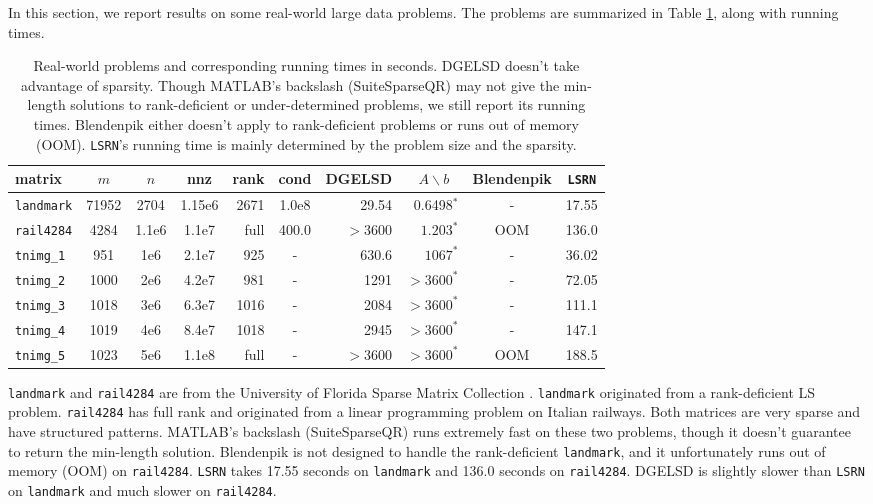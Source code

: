 \documentclass{siamltex}
\begin{document}
In this section, we report results on some real-world large data problems.  The
problems are summarized in Table \ref{tab:real-world-prob}, along with running
times.
\begin{table}
  \centering
  \caption{Real-world problems and corresponding running times in
    seconds. DGELSD doesn't take advantage of sparsity. Though MATLAB's backslash
    (SuiteSparseQR) may not give the min-length solutions to rank-deficient or
    under-determined problems, we still report its running times. Blendenpik either
    doesn't apply to rank-deficient problems or runs out of memory
    (OOM). \texttt{LSRN}'s running time is mainly determined by the problem size
    and the sparsity.}
  \scriptsize
  \newcommand{\z}{\phantom0}
  \begin{tabular}{l||c|c|c|r|c||r|r|c|c}
    matrix & $m$ & $n$ & nnz & rank & cond & DGELSD & $A \backslash b\ \ \ $ & Blendenpik & \texttt{LSRN} \\
    \hline
    \texttt{landmark} & 71952 & 2704 & 1.15e6 & 2671 & 1.0e8 & 29.54\z & 0.6498$^*$ &  - &  17.55 \\
    \texttt{rail4284} & 4284 & 1.1e6 & 1.1e7 & full & 400.0 & $>3600$\z & $1.203^*$ & OOM & 136.0 \\
    \hline
    \texttt{tnimg\_1} &\z951 & 1e6 & 2.1e7 & 925 & - & 630.6\z & $1067^*$ & - & 36.02 \\
    \texttt{tnimg\_2} & 1000 & 2e6 & 4.2e7 & 981 & - & 1291\z & $>3600^*$ & - & 72.05 \\
    \texttt{tnimg\_3} & 1018 & 3e6 & 6.3e7 & 1016 & - & 2084\z & $>3600^*$ & - & 111.1 \\
    \texttt{tnimg\_4} & 1019 & 4e6 & 8.4e7 & 1018 & - &  2945\z & $>3600^*$ & - & 147.1 \\
    \texttt{tnimg\_5} & 1023 & 5e6 & 1.1e8 & full &  - & $>3600$\z & $>3600^*$ & OOM & 188.5 \\
  \end{tabular}
  \label{tab:real-world-prob}
\end{table}

\texttt{landmark} and \texttt{rail4284} are from the University of Florida
Sparse Matrix Collection \cite{davis1997university}. \texttt{landmark}
originated from a rank-deficient LS problem. \texttt{rail4284} has full rank and
originated from a linear programming problem on Italian railways. Both matrices
are very sparse and have structured patterns. MATLAB's backslash (SuiteSparseQR)
runs extremely fast on these two problems, though it doesn't guarantee to return
the min-length solution. Blendenpik is not designed to handle the rank-deficient
\texttt{landmark}, and it unfortunately runs out of memory (OOM) on
\texttt{rail4284}. \texttt{LSRN} takes 17.55 seconds on \texttt{landmark} and
136.0 seconds on \texttt{rail4284}. DGELSD is slightly slower than \texttt{LSRN}
on \texttt{landmark} and much slower on \texttt{rail4284}.
\end{document}
